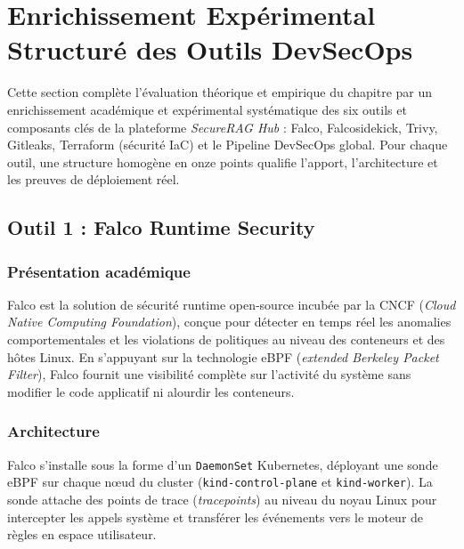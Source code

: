 \section{Enrichissement Expérimental Structuré des Outils DevSecOps}
\label{sec:enrichissement_outils_devsecops}

Cette section complète l'évaluation théorique et empirique du chapitre par un enrichissement académique et expérimental systématique des six outils et composants clés de la plateforme \textit{SecureRAG Hub} : Falco, Falcosidekick, Trivy, Gitleaks, Terraform (sécurité IaC) et le Pipeline DevSecOps global. Pour chaque outil, une structure homogène en onze points qualifie l'apport, l'architecture et les preuves de déploiement réel.

\subsection{Outil 1 : Falco Runtime Security}
\label{subsec:outil_falco}

\subsubsection{Présentation académique}
Falco est la solution de sécurité runtime open-source incubée par la CNCF (\textit{Cloud Native Computing Foundation}), conçue pour détecter en temps réel les anomalies comportementales et les violations de politiques au niveau des conteneurs et des hôtes Linux. En s'appuyant sur la technologie eBPF (\textit{extended Berkeley Packet Filter}), Falco fournit une visibilité complète sur l'activité du système sans modifier le code applicatif ni alourdir les conteneurs.

\subsubsection{Architecture}
Falco s'installe sous la forme d'un \texttt{DaemonSet} Kubernetes, déployant une sonde eBPF sur chaque nœud du cluster (\texttt{kind-control-plane} et \texttt{kind-worker}). La sonde attache des points de trace (\textit{tracepoints}) au niveau du noyau Linux pour intercepter les appels système et transférer les événements vers le moteur de règles en espace utilisateur.


